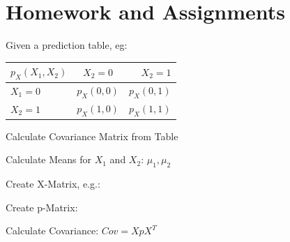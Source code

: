 \documentclass[english]{latex4ei/latex4ei_sheet}
\begin{document}
\newpage
\section{Homework and Assignments}
Given a prediction table, eg:
\begin{tabular}{l|c|r}
    $p_X(X_1,X_2)$& $X_2=0$ & $X_2=1$ \\
    \hline
     $X_1=0$& $p_X(0,0)$& $p_X(0,1)$ \\
     \hline
     $X_2=1$& $p_X(1,0)$& $p_X(1,1)$
\end{tabular}
    \begin{cookbox}{Calculate Covariance Matrix from Table}
            \item Calculate Means for $X_1$ and $X_2$: $\mu_1, \mu_2$
            \item Create X-Matrix, e.g.: 
            \item Create p-Matrix: 
            \item Calculate Covariance: $Cov=XpX^T$
    \end{cookbox}
\end{document}
